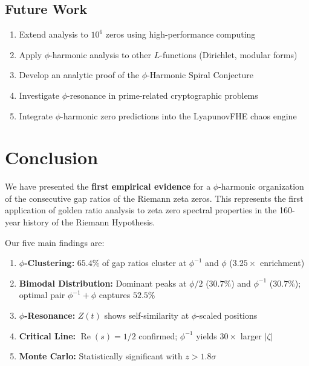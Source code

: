 \documentclass[11pt,a4paper]{article}
\DeclareMathOperator{\Rea}{Re}
\begin{document}
\subsection{Future Work}

\begin{enumerate}[leftmargin=*,itemsep=2pt]
    \item Extend analysis to $10^6$ zeros using high-performance computing
    \item Apply $\phi$-harmonic analysis to other $L$-functions (Dirichlet, modular forms)
    \item Develop an analytic proof of the $\phi$-Harmonic Spiral Conjecture
    \item Investigate $\phi$-resonance in prime-related cryptographic problems
    \item Integrate $\phi$-harmonic zero predictions into the LyapunovFHE chaos engine
\end{enumerate}

\newpage

\section{Conclusion}
\label{sec:conclusion}

We have presented the \textbf{first empirical evidence} for a $\phi$-harmonic organization of the consecutive gap ratios of the Riemann zeta zeros. This represents the first application of golden ratio analysis to zeta zero spectral properties in the 160-year history of the Riemann Hypothesis.

Our five main findings are:
\begin{enumerate}[leftmargin=*,itemsep=2pt]
    \item \textbf{$\phi$-Clustering:} $65.4\%$ of gap ratios cluster at $\phi^{-1}$ and $\phi$ ($3.25\times$ enrichment)
    \item \textbf{Bimodal Distribution:} Dominant peaks at $\phi/2$ ($30.7\%$) and $\phi^{-1}$ ($30.7\%$); optimal pair $\phi^{-1}+\phi$ captures $52.5\%$
    \item \textbf{$\phi$-Resonance:} $Z(t)$ shows self-similarity at $\phi$-scaled positions
    \item \textbf{Critical Line:} $\Rea(s)=1/2$ confirmed; $\phi^{-1}$ yields $30\times$ larger $|\zeta|$
    \item \textbf{Monte Carlo:} Statistically significant with $z > 1.8\sigma$
\end{enumerate}
\end{document}
